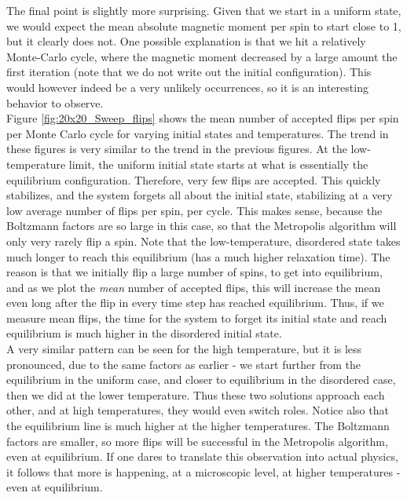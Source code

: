 \documentclass[a4paper, 10pt]{article}
\begin{document}
The final point is slightly more surprising. Given that we start in a uniform state, we would expect the mean absolute magnetic moment per spin to start close to 1, but it clearly does not. One possible explanation is that we hit a relatively Monte-Carlo cycle, where the magnetic moment decreased by a large amount the first iteration (note that we do not write out the initial configuration). This would however indeed be a very unlikely occurrences, so it is an interesting behavior to observe. \\
\linebreak
Figure \ref{fig:20x20_Sweep_flips} shows the mean number of accepted flips per spin per Monte Carlo cycle for varying initial states and temperatures. The trend in these figures is very similar to the trend in the previous figures. At the low-temperature limit, the uniform initial state starts at what is essentially the equilibrium configuration. Therefore, very few flips are accepted. This quickly stabilizes, and the system forgets all about the initial state, stabilizing at a very low average number of flips per spin, per cycle. This makes sense, because the Boltzmann factors are so large in this case, so that the Metropolis algorithm will only very rarely flip a spin. Note that the low-temperature, disordered state takes much longer to reach this equilibrium (has a much higher relaxation time). The reason is that we initially flip a large number of spins, to get into equilibrium, and as we plot the \textit{mean} number of accepted flips, this will increase the mean even long after the flip in every time step has reached equilibrium. Thus, if we measure mean flips, the time for the system to forget its initial state and reach equilibrium is much higher in the disordered initial state.\\
\linebreak
A very similar pattern can be seen for the high temperature, but it is less pronounced, due to the same factors as earlier - we start further from the equilibrium in the uniform case, and closer to equilibrium in the disordered case, then we did at the lower temperature. Thus these two solutions approach each other, and at high temperatures, they would even switch roles. Notice also that the equilibrium line is much higher at the higher temperatures. The Boltzmann factors are smaller, so more flips will be successful in the Metropolis algorithm, even at equilibrium. If one dares to translate this observation into actual physics, it follows that more is happening, at a microscopic level, at higher temperatures - even at equilibrium.\\
\end{document}
